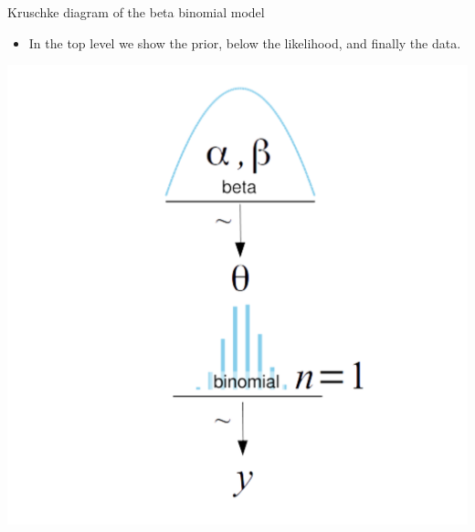 \documentclass[
  13pt,
  ignorenonframetext,
]{beamer}
\providecommand{\tightlist}{%
  \setlength{\itemsep}{0pt}\setlength{\parskip}{0pt}}
\begin{document}
\begin{frame}{Kruschke diagram of the beta binomial model}
\protect\hypertarget{kruschke-diagram-of-the-beta-binomial-model}{}
\begin{itemize}
\tightlist
\item
  In the top level we show the prior, below the likelihood, and finally
  the data.
\end{itemize}

\begin{center}\includegraphics[width=22.92in]{coin_model} \end{center}
\end{frame}
\end{document}
